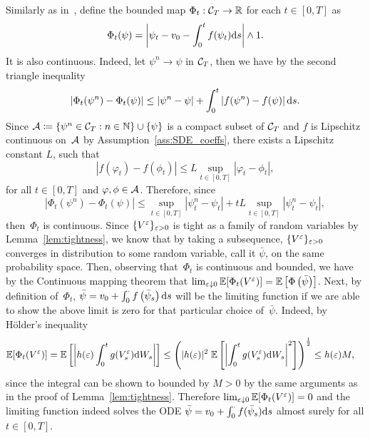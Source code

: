 Similarly as in~\cite{Chiarini2014OnProcesses}, define the bounded map $\Phi_t:\mathcal{C}_T\rightarrow \mathbb{R}$ for each $t\in[0,T]$ as 
$$
\Phi_t(\psi) = \left \vert \psi_t - v_0 - \int_0^t f(\psi_t)\mathrm{d} s \right \vert \land 1.
$$
It is also continuous. 
Indeed, let $\psi^n \rightarrow \psi$ in $\mathcal{C}_T$, then we have by the second triangle inequality 
$$
\left \vert \Phi_t(\psi^n) - \Phi_t(\psi) \right \vert \leq  \left \vert \psi^n - \psi \right \vert + \int_0^t \left \vert f(\psi^n) - f(\psi) \right \vert\mathrm{d} s.
$$
Since $\mathcal{A}\coloneqq \{\psi^n\in\mathcal{C}_T: n\in\mathbb{N}\}\cup \{\psi\}$ is a compact subset of $\mathcal{C}_T$ and $f$ is Lipschitz continuous on~$\mathcal{A}$ by Assumption~\ref{ass:SDE_coeffs}, there exists a Lipschitz constant $L$, such that
\[
\left\vert f(\varphi_t) - f(\phi_t) \right\vert \leq L \sup_{t\in[0,T]} |\varphi_t - \phi_t|,
\]
for all $t\in[0,T]$ and $\varphi, \phi\in\mathcal{A}$. Therefore, since
\[
\left \vert \Phi_t(\psi^n) - \Phi_t(\psi) \right \vert \leq \sup_{t\in[0,T]} \left \vert\psi_t^n - \psi_t\right \vert + t L \sup_{t\in[0,T]} \left \vert\psi_t^n - \psi_t\right \vert,
\]
then~$\Phi_t$ is continuous. Since $\{V^\varepsilon\}_{\varepsilon>0}$ is tight as a family of random variables by Lemma~\ref{lem:tightness}, we know that by taking a subsequence, $\{V^\varepsilon\}_{\varepsilon>0}$ converges in distribution to some random variable, call it $\bar\psi$, on the same probability space. 
Then, observing that~$\Phi_t$ is continuous and bounded, we have by the Continuous mapping theorem that $\lim_{\varepsilon\downarrow 0} \mathbb{E}[\Phi_t(V^\varepsilon)]=\mathbb{E}\left[\Phi\left(\bar\psi\right)\right]$. Next, by definition of~$\Phi_t$, $\bar{\psi}=v_0 + \int_0^\cdot f\left(\bar{\psi}_s\right)\mathrm{d} s$ will be the limiting function if we are able to show the above limit is zero for that particular choice of~$\bar\psi$. Indeed, by H{\"o}lder's inequality %
\begin{align*}
\EE[\Phi_t(V^\eps)]
 = \EE\left[\left\vert h(\eps) \int_0^t g(V_s^\eps) \D W_s \right\vert\right]
  & \leq \left( |h(\eps)|^2 \; \EE\left[\left\vert \int_0^t g(V_s^\eps) \D W_s \right\vert^2\right] \right)^{\frac{1}{2}} %
  \leq h(\eps) M,
\end{align*}
since the integral can be shown to bounded by $M>0$ by the same arguments as in the proof of Lemma~\ref{lem:tightness}. Therefore $\lim_{\varepsilon\downarrow 0} \mathbb{E}[\Phi_t(V^\varepsilon)] = 0$ and the limiting function indeed solves the ODE $\bar{\psi}=v_0 + \int_0^\cdot f(\bar{\psi}_s)\mathrm{d} s$ almost surely for all $t\in[0,T]$.

